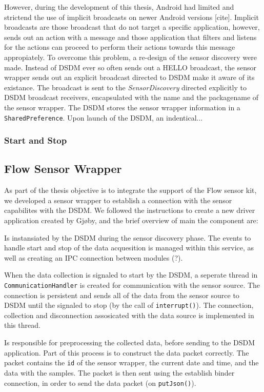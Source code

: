     However, during the development of this thesis, Android had limited and strictend the use of implicit broadcasts on newer Android versions [cite]. Implicit broadcasts are those broadcast that do not target a specific application, however, sends out an action with a message and those application that filters and listens for the actions can proceed to perform their actions towards this message appropiately. To overcome this problem, a re-design of the sensor discovery were made. Instead of DSDM ever so often sends out a HELLO broadcast, the sensor wrapper sends out an explicit broadcast directed to DSDM make it aware of its existance. The broadcast is sent to the \textit{SensorDiscovery} directed explicitly to DSDM broadcast receivers, encapsulated with the name and the packagename of the sensor wrapper. The DSDM stores the sensor wrapper information in a \verb|SharedPreference|. Upon launch of the DSDM, an indentical...

\subsubsection{Start and Stop}

\subsection{Flow Sensor Wrapper}
As part of the thesis objective is to integrate the support of the Flow sensor kit, we developed a sensor wrapper to establish a connection with the sensor capabilites with the DSDM. We followed the instructions to create a new driver application created by Gjøby, and the brief overview of main the component are:

\begin{description}[font=\normalfont\itshape]
    \item[WrapperService] Is instansiated by the DSDM during the sensor discovery phase. The events to handle start and stop of the data acquesition is managed within this service, as well as creating an IPC connection between modules (?). 
    \item[CommunicationHandler] When the data collection is signaled to start by the DSDM, a seperate thread in \verb|CommunicationHandler| is created for communication with the sensor source. The connection is persistent and sends all of the data from the sensor source to DSDM until the signaled to stop (by the call of \verb|interrupt()|). The connection, collection and disconnection assosicated with the data source is implemented in this thread.
    \item[BluetoothHandler] 
    \item[DataHandler] Is responsible for preprocessing the collected data, before sending to the DSDM application. Part of this process is to construct the data packet correctly. The packet contains the \verb|id| of the sensor wrapper, the current date and time, and the data with the samples. The packet is then sent using the establish binder connection, in order to send the data packet (on \verb|putJson()|).
\end{description}

